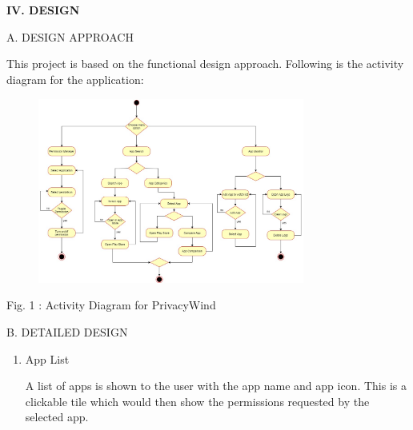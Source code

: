 \documentclass[12pt]{report}
\renewcommand{\_}{\kern-1.5pt\textunderscore\kern-1.5pt}
\begin{document}
\begin{multicols}{2}
\vspace{\baselineskip}

\vspace{\baselineskip}
\begin{Center}
{\fontsize{10pt}{12.0pt}\selectfont \textbf{IV. DESIGN}}
\end{Center}

\vspace{\baselineskip}
\begin{justify}
{\fontsize{10pt}{12.0pt}\selectfont A. DESIGN APPROACH}
\end{justify}
\begin{justify}
{\fontsize{10pt}{12.0pt}\selectfont \tab This project is based on the functional design approach. Following is the activity diagram for the application:\par}
\end{justify}

\vspace{\baselineskip}



\begin{figure}[H]
	\begin{Center}
		\includegraphics[width=3.45in,height=2.4in]{./media/image9.jpg}
	\end{Center}
\end{figure}




\vspace{\baselineskip}\begin{Center}
{\fontsize{10pt}{12.0pt}\selectfont Fig. 1 : Activity Diagram for PrivacyWind}
\end{Center}

\vspace{\baselineskip}
\begin{justify}
{\fontsize{10pt}{12.0pt}\selectfont B. DETAILED DESIGN}
\end{justify}
\begin{enumerate}
	\item {\fontsize{10pt}{12.0pt}\selectfont App List}
\begin{justify}
{\fontsize{10pt}{12.0pt}\selectfont A list of apps is shown to the user with the app name and app icon. This is a clickable tile which would then show the permissions requested by the selected app.\par}
\end{justify}


\end{enumerate}
\end{multicols}
\end{document}
